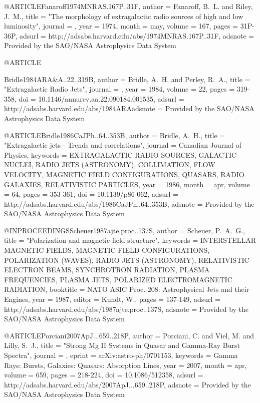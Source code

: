 \documentclass[twocolumn]{aastex62}
\begin{document}
{{{{{{{{{{{{@ARTICLE{Fanaroff1974MNRAS.167P..31F,
   author = {{Fanaroff}, B.~L. and {Riley}, J.~M.},
    title = "{The morphology of extragalactic radio sources of high and low luminosity}",
  journal = {\mnras},
     year = 1974,
    month = may,
   volume = 167,
    pages = {31P-36P},
   adsurl = {http://adsabs.harvard.edu/abs/1974MNRAS.167P..31F},
  adsnote = {Provided by the SAO/NASA Astrophysics Data System}
}


@ARTICLE{Bridle1984ARA&A..22..319B,
   author = {{Bridle}, A.~H. and {Perley}, R.~A.},
    title = "{Extragalactic Radio Jets}",
  journal = {\araa},
     year = 1984,
   volume = 22,
    pages = {319-358},
      doi = {10.1146/annurev.aa.22.090184.001535},
   adsurl = {http://adsabs.harvard.edu/abs/1984ARAadsnote = {Provided by the SAO/NASA Astrophysics Data System}
}

@ARTICLE{Bridle1986CaJPh..64..353B,
   author = {{Bridle}, A.~H.},
    title = "{Extragalactic jets - Trends and correlations}",
  journal = {Canadian Journal of Physics},
 keywords = {EXTRAGALACTIC RADIO SOURCES, GALACTIC NUCLEI, RADIO JETS (ASTRONOMY), COLLIMATION, FLOW VELOCITY, MAGNETIC FIELD CONFIGURATIONS, QUASARS, RADIO GALAXIES, RELATIVISTIC PARTICLES},
     year = 1986,
    month = apr,
   volume = 64,
    pages = {353-361},
      doi = {10.1139/p86-062},
   adsurl = {http://adsabs.harvard.edu/abs/1986CaJPh..64..353B},
  adsnote = {Provided by the SAO/NASA Astrophysics Data System}
}

@INPROCEEDINGS{Scheuer1987ajte.proc..137S,
   author = {{Scheuer}, P.~A.~G.},
    title = "{Polarization and magnetic field structure}",
 keywords = {INTERSTELLAR MAGNETIC FIELDS, MAGNETIC FIELD CONFIGURATIONS, POLARIZATION (WAVES), RADIO JETS (ASTRONOMY), RELATIVISTIC ELECTRON BEAMS, SYNCHROTRON RADIATION, PLASMA FREQUENCIES, PLASMA JETS, POLARIZED ELECTROMAGNETIC RADIATION},
booktitle = {NATO ASIC Proc. 208: Astrophysical Jets and their Engines},
     year = 1987,
   editor = {{Kundt}, W.},
    pages = {137-149},
   adsurl = {http://adsabs.harvard.edu/abs/1987ajte.proc..137S},
  adsnote = {Provided by the SAO/NASA Astrophysics Data System}
}


@ARTICLE{Porciani2007ApJ...659..218P,
   author = {{Porciani}, C. and {Viel}, M. and {Lilly}, S.~J.},
    title = "{Strong Mg II Systems in Quasar and Gamma-Ray Burst Spectra}",
  journal = {\apj},
   eprint = {arXiv:astro-ph/0701153},
 keywords = {Gamma Rays: Bursts, Galaxies: Quasars: Absorption Lines},
     year = 2007,
    month = apr,
   volume = 659,
    pages = {218-224},
      doi = {10.1086/512358},
   adsurl = {http://adsabs.harvard.edu/abs/2007ApJ...659..218P},
  adsnote = {Provided by the SAO/NASA Astrophysics Data System}
}

}}}}}}}}}}}}}
\end{document}
